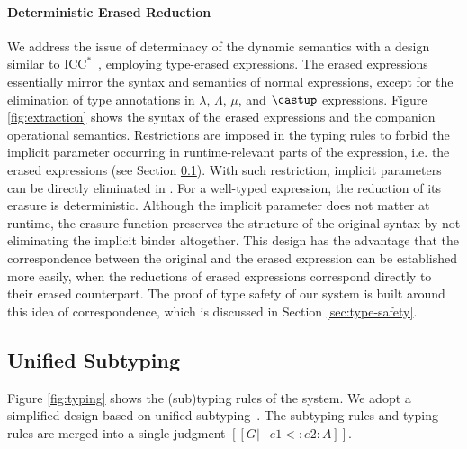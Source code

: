 \paragraph{Deterministic Erased Reduction}
We address the issue of determinacy of the dynamic semantics with
a design similar to $\mathrm{ICC}^*$~\citep{barras2008implicit},
employing type-erased expressions. The erased expressions
essentially mirror the syntax and semantics
of normal expressions, except for the elimination of type annotations in $\lambda$,
$\Lambda$, $\mu$, and $\castup$ expressions.
Figure \ref{fig:extraction} shows the syntax of the erased expressions and
the companion operational semantics. Restrictions are imposed in the
typing rules to forbid the implicit parameter occurring in runtime-relevant parts
of the expression, i.e. the erased expressions (see Section \ref{sec:type-system}).
With such restriction, implicit parameters can be directly eliminated in
.
For a well-typed expression, the reduction of
its erasure is deterministic.
Although the implicit parameter does not matter at runtime, the erasure
function preserves the structure of the original syntax
by not eliminating the implicit binder altogether. This design
has the advantage that the correspondence
between the original and the erased expression can be established more easily,
when the reductions of erased expressions correspond directly to their erased counterpart.
The proof of type safety of our system is built around this idea of correspondence,
which is discussed in Section \ref{sec:type-safety}.

\subsection{Unified Subtyping}
\label{sec:type-system}

Figure \ref{fig:typing} shows the (sub)typing rules of the system. We adopt a
simplified design based on unified subtyping~\citep{full}. The subtyping rules and
typing rules are merged into a single judgment $[[G |- e1 <: e2 : A]]$.

